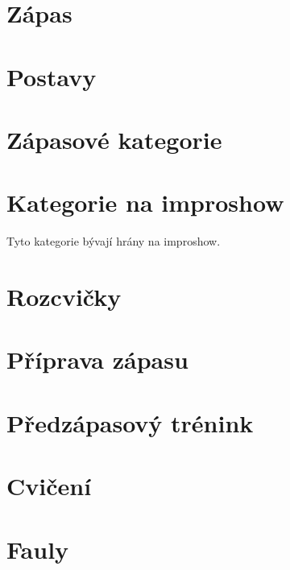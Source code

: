 \documentclass[a4paper,10pt,openany]{book}
\begin{document}
\chapter{Zápas}







\chapter{Postavy}



\chapter{Zápasové kategorie}
\label{zápasové kategorie}
\label{:kategorie:zápasové kategorie}



\chapter{Kategorie na improshow}\label{další kategorie}
\label{:kategorie:kategorie na improshow}
Tyto kategorie bývají hrány na improshow.


\chapter{Rozcvičky}\label{rozcvičky}
\label{:kategorie:rozcvičky}





\chapter{Příprava zápasu}


\chapter{Předzápasový trénink}


\chapter{Cvičení}


\chapter{Fauly}\label{fauly}

\label{:kategorie:fauly}
 
 
\end{document}
